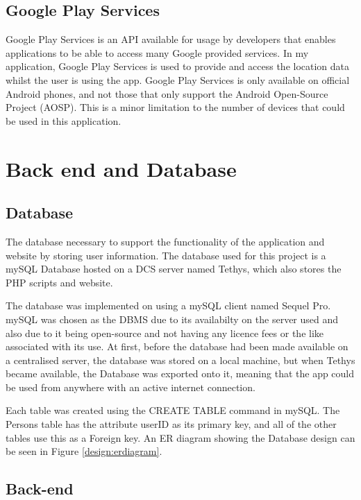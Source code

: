 \documentclass{l4proj}
\begin{document}
\subsection{Google Play Services}

Google Play Services is an API available for usage by developers that enables applications to be able to access many Google provided services. In my application, Google Play Services is used to provide and access the location data whilst the user is using the app. Google Play Services is only available on official Android phones, and not those that only support the Android Open-Source Project (AOSP). This is a minor limitation to the number of devices that could be used in this application.

\section{Back end and Database}

\subsection{Database}

The database necessary to support the functionality of the application and website by storing user information. The database used for this project is a mySQL Database hosted on a DCS server named Tethys, which also stores the PHP scripts and website.

The database was implemented on using a mySQL client named Sequel Pro. mySQL was chosen as the DBMS due to its availabilty on the server used and also due to it being open-source and not having any licence fees or the like associated with its use. At first, before the database had been made available on a centralised server, the database was stored on a local machine, but when Tethys became available, the Database was exported onto it, meaning that the app could be used from anywhere with an active internet connection.

Each table was created using the CREATE TABLE command in mySQL. The Persons table has the attribute userID as its primary key, and all of the other tables use this as a Foreign key. An ER diagram showing the Database design can be seen in Figure \ref{design:erdiagram}.

\subsection{Back-end}
\end{document}

